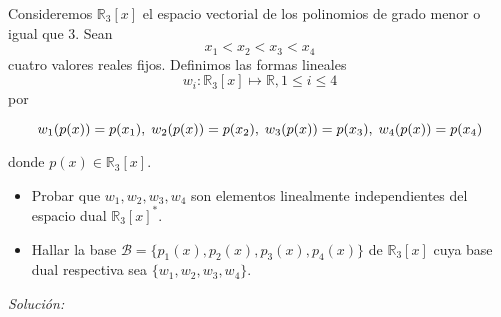 \question Consideremos $\mathbb{R}_3[x]$ el espacio vectorial de los polinomios de grado menor o igual que 3. Sean
\begin{equation*}
    x_1 < x_2 < x_3 < x_4
\end{equation*}
cuatro valores reales fijos. Definimos las formas lineales
\begin{equation*}
    w_i : \mathbb{R}_3[x] \mapsto \mathbb{R}, 1 \leq i \leq 4
\end{equation*}
por

\begin{equation*}
    w_1(p(x)) = p(x_1),\; w_2(p(x)) = p(x_2),\; w_3(p(x)) = p(x_3),\; w_4(p(x)) = p(x_4)\\
\end{equation*}

donde $p(x) \in \mathbb{R}_3[x]$.

\begin{itemize}[$\bullet$]
    \item Probar que $w_1, w_2, w_3, w_4$ son elementos linealmente independientes del espacio dual $\mathbb{R}_3[x]^*$.
    \item Hallar la base $\mathcal{B} = \{p_1(x), p_2(x), p_3(x), p_4(x)\}$ de $\mathbb{R}_3[x]$ cuya base dual respectiva sea $\{w_1, w_2, w_3, w_4\}$.
\end{itemize}

\vspace{20px}
\textit{Solución:}

\newcommand\myvectors{$w_1, w_2, w_3, w_4$ }

